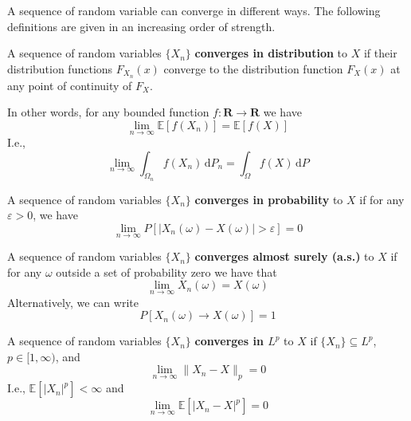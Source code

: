 A sequence of random variable can converge in different ways. The following definitions are given in an increasing order of strength.

\begin{definition}
	A sequence of random variables $\{ X_n \}$ \textbf{converges in distribution} to $X$ if their distribution functions $F_{X_n}(x)$ converge to the distribution function $F_X(x)$ at any point of continuity of $F_X$.
	
	In other words, for any bounded function $f : \textbf{R} \longrightarrow \textbf{R}$ we have
	\[
		\lim_{n \to \infty} \mathbb{E}[f(X_n)] = \mathbb{E}[f(X)]
	\]
	I.e.,
	\[
		\lim_{n \to \infty} \int_{\Omega_n} f(X_n) \, \mathrm{d}P_n = \int_{\Omega} f(X) \, \mathrm{d}P
	\]
\end{definition}

\begin{definition}
	A sequence of random variables $\{ X_n \}$ \textbf{converges in probability} to $X$ if for any $\varepsilon > 0$, we have
	\[
		\lim_{n \to \infty} P[|X_n(\omega) - X(\omega)| > \varepsilon] = 0
	\]
\end{definition}

\begin{definition}
	A sequence of random variables $\{ X_n \}$ \textbf{converges almost surely (a.s.)} to $X$ if for any $\omega$ outside a set of probability zero we have that
	\[
		\lim_{n \to \infty} X_n(\omega) = X(\omega)
	\]
	Alternatively, we can write
	\[
		P[X_n(\omega) \to X(\omega)] = 1
	\]
\end{definition}

\begin{definition}[$L^p$-Convergence]
	A sequence of random variables $\{ X_n \}$ \textbf{converges in $L^p$} to $X$ if $\{X_n\} \subseteq L^p$, $p \in [1,\infty)$, and
	\[
		\lim_{n \to \infty} \|X_n - X\|_p = 0
	\]
	I.e., $\mathbb{E} \left[ |X_n|^p \right] < \infty$ and
	\[
		\lim_{n \to \infty} \mathbb{E} \left[ |X_n - X|^p \right] = 0
	\]
\end{definition}